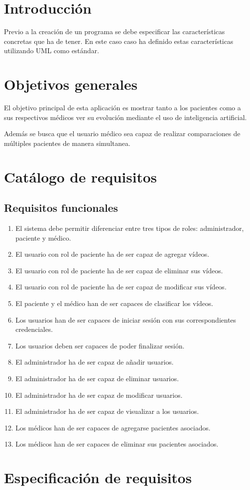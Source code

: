 
\section{Introducción}
Previo a la creación de un programa se debe especificar las características concretas que ha de tener.
En este caso caso ha definido estas características utilizando UML como estándar.



\section{Objetivos generales}
El objetivo principal de esta aplicación es mostrar tanto a los pacientes como a sus respectivos médicos ver su evolución mediante el uso de inteligencia artificial.

Además se busca que el usuario médico sea capaz de realizar comparaciones de múltiples pacientes de manera simultanea.

\section{Catálogo de requisitos}
\subsection{Requisitos funcionales}
\begin{enumerate}[label=\textbf{RF\arabic*:}, left=0pt, itemindent=1.5em]

\item El sistema debe permitir diferenciar entre tres tipos de roles: administrador, paciente y médico.
\item El usuario con rol de paciente ha de ser capaz de agregar vídeos.
\item El usuario con rol de paciente ha de ser capaz de eliminar sus vídeos.
\item El usuario con rol de paciente ha de ser capaz de modificar sus vídeos.
\item El paciente y el médico han de ser capaces de clasificar los vídeos.
\item Los usuarios han de ser capaces de iniciar sesión con sus correspondientes credenciales.
\item Los usuarios deben ser capaces de poder finalizar sesión.
\item El administrador ha de ser capaz de añadir usuarios.
\item El administrador ha de ser capaz de eliminar usuarios.
\item El administrador ha de ser capaz de modificar usuarios.
\item El administrador ha de ser capaz de visualizar a los usuarios.
\item Los médicos han de ser capaces de agregarse pacientes asociados.
\item Los médicos han de ser capaces de eliminar sus pacientes asociados.

\end{enumerate}

\section{Especificación de requisitos}


